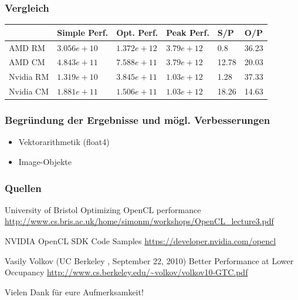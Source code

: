 \documentclass{beamer}
\begin{document}
\begin{frame}
\frametitle{Vergleich}

\begin{tabular}{|l|l|l|l|l|l|}
	\hline  & Simple Perf. & Opt. Perf. & Peak Perf. & S/P & O/P \\ 
	\hline AMD RM & $3.056e+10$ & $1.372e+12$ & $3.79e+12$ & 0.8 & 36.23 \\ 
	\hline AMD CM & $4.843e+11$ & $7.588e+11$ & $3.79e+12$ & 12.78 & 20.03 \\ 
	\hline Nvidia RM & $ 1.319e+10$ & $3.845e+11$ & $1.03e+12$ & 1.28 & 37.33 \\ 
	\hline Nvidia CM & $ 1.881e+11$ & $1.506e+11$ & $1.03e+12$ & 18.26 & 14.63 \\ 
	\hline 
	\end{tabular} 
	
\end{frame}


\begin{frame}
\frametitle{Begr\"undung der Ergebnisse und m\"ogl. Verbesserungen}

\begin{itemize}
\item Vektorarithmetik (float4)
\item Image-Objekte
\end{itemize}

 
\end{frame}














\begin{frame}
\frametitle{Quellen}


\footnotesize{
\begin{thebibliography}{99}
  University of Bristol
 \newblock Optimizing OpenCL performance
 \newblock \url{http://www.cs.bris.ac.uk/home/simonm/workshops/OpenCL_lecture3.pdf} 
\end{thebibliography}
}



\footnotesize{
\begin{thebibliography}{99}
 NVIDIA 
 \newblock OpenCL SDK Code Samples
 \newblock \url{https://developer.nvidia.com/opencl} 
\end{thebibliography}
}


\footnotesize{
\begin{thebibliography}{99}
  Vasily Volkov
(UC Berkeley , September 22, 2010)
 \newblock Better Performance at Lower Occupancy 
 \newblock \url{http://www.cs.berkeley.edu/~volkov/volkov10-GTC.pdf} 
\end{thebibliography}
}





\end{frame}
 
 
 
\begin{frame}
\centerline{Vielen Dank f{\"u}r eure Aufmerksamkeit!}
\end{frame}
\end{document}
